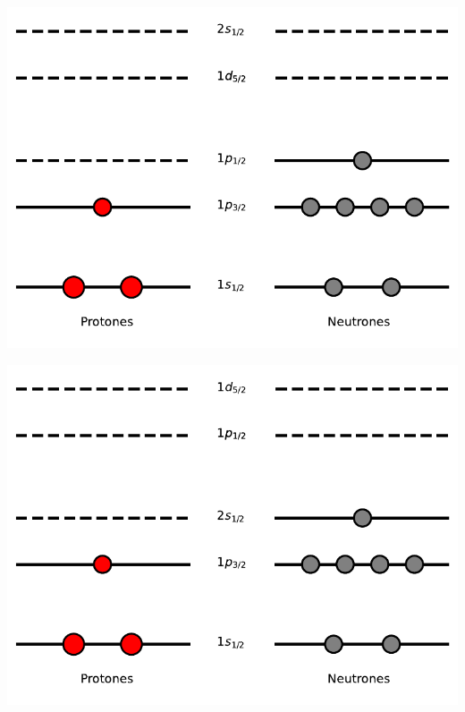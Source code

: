 \begin{minipage}{0.48\linewidth}
    \centering
    \includegraphics[width=1.0\linewidth]{Imagenes/Capas_10Li.pdf}
    \label{Fig:2-Li10_1}
\end{minipage}
\hfill
\begin{minipage}{0.48\linewidth}
    \centering
    \includegraphics[width=1.0\linewidth]{Imagenes/Capas_10Li2.pdf}
    \label{Fig:2-Li10_2}
\end{minipage}

\vspace*{0.5cm}

